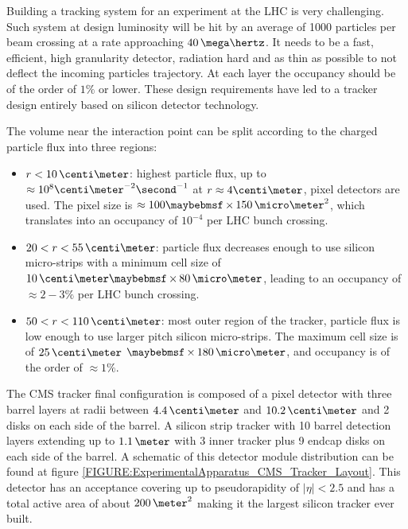 Building a tracking system for an experiment at the \gls{LHC} is very challenging. Such system at design luminosity will be hit by an average of 1000 particles per beam crossing at a rate approaching $40\,\mega\hertz$. It needs to be a fast, efficient, high granularity detector, radiation hard and as thin as possible to not deflect the incoming particles trajectory. At each layer the occupancy should be of the order of $1\%$ or lower. These design requirements have led to a tracker design entirely based on silicon detector technology. 

The volume near the interaction point can be split according to the charged particle flux into three regions:

\begin{itemize}
  \item $r<10\,\centi\meter$: highest particle flux, up to $\approx 10^8 \centi\meter^{-2}\second^{-1}$ at $r \approx 4 \centi\meter$, pixel detectors are used. The pixel size is $\approx 100 \times 150\,\micro\meter^2$, which translates into an occupancy of $10^{-4}$ per \gls{LHC} bunch crossing.
  \item $20<r<55\,\centi\meter$: particle flux decreases enough to use silicon micro-strips with a minimum cell size of $10\,\centi\meter \times 80\,\micro\meter$, leading to an occupancy of $\approx 2-3\%$ per \gls{LHC} bunch crossing.
  \item $50<r<110\,\centi\meter$: most outer region of the tracker, particle flux is low enough to use larger pitch silicon micro-strips. The maximum cell size is of $25\,\centi\meter$ $\times 180\,\micro\meter$, and occupancy is of the order of $\approx 1\%$.
\end{itemize}

The \gls{CMS} tracker final configuration is composed of a pixel detector with three barrel layers at radii between $4.4\,\centi\meter$ and $10.2\,\centi\meter$ and 2 disks on each side of the barrel. A silicon strip tracker with 10 barrel detection layers extending up to $1.1\,\meter$ with 3 inner tracker plus 9 endcap disks on each side of the barrel. A schematic of this detector module distribution can be found at figure \ref{FIGURE:ExperimentalApparatus_CMS_Tracker_Layout}. This detector has an acceptance covering up to pseudorapidity of $|\eta|<2.5$ and has a total active area of about $200\,\meter^2$ making it the largest silicon tracker ever built. 

